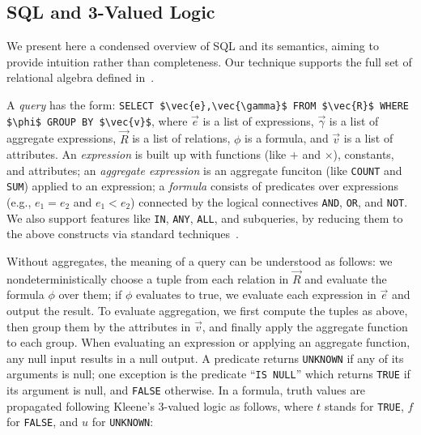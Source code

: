 \documentclass[sigconf]{acmart}
\begin{document}
\subsection{SQL and 3-Valued Logic}
We present here a condensed overview of SQL and its semantics,
 aiming to provide intuition rather than completeness.
Our technique supports the full set of relational algebra 
 defined in~\cite{DBLP:conf/pods/LibkinP23}.

A {\em query} has the form:
%
\lstinline[mathescape=true]|SELECT $\vec{e},\vec{\gamma}$ FROM $\vec{R}$ WHERE $\phi$ GROUP BY $\vec{v}$|,
%
where $\vec{e}$ is a list of expressions,
 $\vec{\gamma}$ is a list of aggregate expressions,
 $\vec{R}$ is a list of relations,
 $\phi$ is a formula,
 and $\vec{v}$ is a list of attributes.
An {\em expression} is built up with functions 
 (like $+$ and $\times$),
 constants, and attributes;
 an {\em aggregate expression} is an
 aggregate funciton 
 (like \lstinline[mathescape=true]|COUNT| 
 and \lstinline[mathescape=true]|SUM|)
 applied to an expression;
 a {\em formula} consists of predicates over expressions
 (e.g., $e_1 = e_2$ and $e_1 < e_2$) 
 connected by the logical connectives 
 \lstinline|AND|,
 \lstinline|OR|, and
 \lstinline|NOT|.
We also support features like 
 \lstinline|IN|,
 \lstinline|ANY|, 
 \lstinline|ALL|,
 and subqueries, 
 by reducing them to the above constructs
 via standard techniques~\cite{DBLP:conf/pods/LibkinP23, DBLP:conf/btw/0001K15}.
 
Without aggregates, the meaning of a query can be understood
 as follows:
 we nondeterministically choose a tuple
 from each relation in $\vec{R}$ 
 and evaluate the formula $\phi$ over them;
 if $\phi$ evaluates to true,
 we evaluate each expression in $\vec{e}$ and output the result.
To evaluate aggregation,
 we first compute the tuples as above,
 then group them by the attributes in $\vec{v}$,
 and finally apply the aggregate function to each group.
When evaluating an expression or applying an aggregate function, 
 any null input results in a null output.
A predicate returns \lstinline|UNKNOWN| if 
 any of its arguments is null;
 one exception is the predicate ``\lstinline|IS NULL|''
 which returns \lstinline|TRUE| if its argument is null,
 and \lstinline|FALSE| otherwise.
In a formula, truth values are propagated
 following Kleene's 3-valued logic as follows, 
 where $t$ stands for \lstinline|TRUE|, 
 $f$ for \lstinline|FALSE|, and $u$ for \lstinline|UNKNOWN|:
\end{document}
